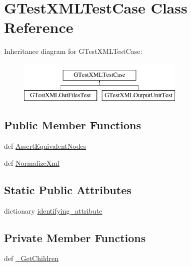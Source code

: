 \hypertarget{classgtest__xml__test__utils_1_1GTestXMLTestCase}{\section{\-G\-Test\-X\-M\-L\-Test\-Case \-Class \-Reference}
\label{d0/d31/classgtest__xml__test__utils_1_1GTestXMLTestCase}
}
\-Inheritance diagram for \-G\-Test\-X\-M\-L\-Test\-Case\-:\begin{figure}[H]
\begin{center}
\leavevmode
\includegraphics[height=2.000000cm]{d0/d31/classgtest__xml__test__utils_1_1GTestXMLTestCase}
\end{center}
\end{figure}
\subsection*{\-Public \-Member \-Functions}
\begin{DoxyCompactItemize}
\item 
def \hyperlink{classgtest__xml__test__utils_1_1GTestXMLTestCase_a54b749d8bf072a59825202db458cdd2b}{\-Assert\-Equivalent\-Nodes}
\item 
def \hyperlink{classgtest__xml__test__utils_1_1GTestXMLTestCase_a321f96b173f10ef00ba182147aafa163}{\-Normalize\-Xml}
\end{DoxyCompactItemize}
\subsection*{\-Static \-Public \-Attributes}
\begin{DoxyCompactItemize}
\item 
dictionary \hyperlink{classgtest__xml__test__utils_1_1GTestXMLTestCase_adecb9d1291e48bb151b7e46f14ea7df7}{identifying\-\_\-attribute}
\end{DoxyCompactItemize}
\subsection*{\-Private \-Member \-Functions}
\begin{DoxyCompactItemize}
\item 
def \hyperlink{classgtest__xml__test__utils_1_1GTestXMLTestCase_ab3de1cda0d4c2c22c771a57d8344bb32}{\-\_\-\-Get\-Children}
\end{DoxyCompactItemize}


